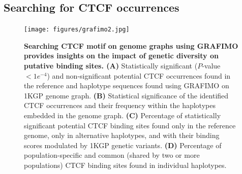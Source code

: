 \documentclass[a4paper, titlepage, openright]{book}
\newcommand{\grafimo}{GRAFIMO\xspace}
\begin{document}
\subsection{Searching for CTCF occurrences}
\begin{figure}
    \centering
    \texttt{[image: figures/grafimo2.jpg]}
    \caption[Searching CTCF motif on genome graphs using \grafimo provides insights on the impact of genetic diversity on putative binding sites]{\textbf{Searching CTCF motif on genome graphs using \grafimo provides insights on the impact of genetic diversity on putative binding sites. (A)} Statistically significant ($P$-value $< 1e^{-4}$) and non-significant potential CTCF occurrences found in the reference and haplotype sequences found using \grafimo on 1KGP genome graph. \textbf{(B)} Statistical significance of the identified CTCF occurrences and their frequency within the haplotypes embedded in the genome graph. \textbf{(C)} Percentage of statistically significant potential CTCF binding sites found only in the reference genome, only in alternative haplotypes, and with their binding scores modulated by 1KGP genetic variants. \textbf{(D)} Percentage of population-specific and common (shared by two or more populations) CTCF binding sites found in individual haplotypes.}
    \label{fig:grafimo-ctcf}
\end{figure}
% 
\end{document}

